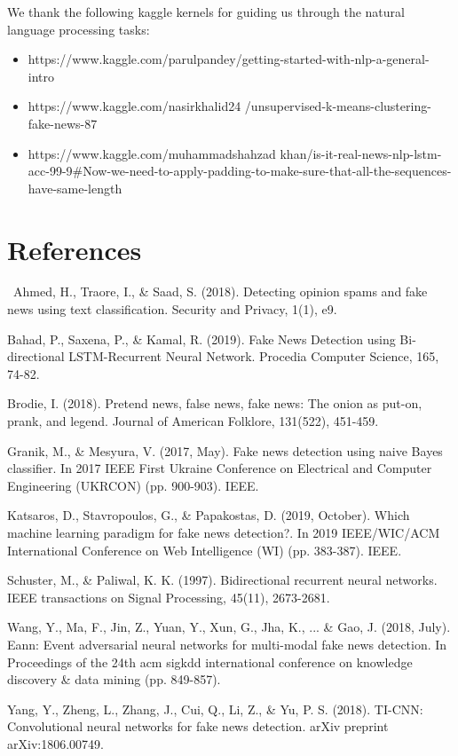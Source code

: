 \documentclass{article}
\begin{document}
\begin{multicols}{2}
We thank the following kaggle kernels for guiding us through the natural language processing tasks:
\begin{itemize}
    \item https://www.kaggle.com/parulpandey/getting-started-with-nlp-a-general-intro
    \item https://www.kaggle.com/nasirkhalid24 /unsupervised-k-means-clustering-fake-news-87
    \item https://www.kaggle.com/muhammadshahzad
    khan/is-it-real-news-nlp-lstm-acc-99-9#Now-we-need-to-apply-padding-to-make-sure-that-all-the-sequences-have-same-length
\end{itemize}


\section{References}

\quad \, Ahmed, H., Traore, I., \& Saad, S. (2018). Detecting opinion spams and fake news using text classification. Security and Privacy, 1(1), e9.

Bahad, P., Saxena, P., \& Kamal, R. (2019). Fake News Detection using Bi-directional LSTM-Recurrent Neural Network. Procedia Computer Science, 165, 74-82.

Brodie, I. (2018). Pretend news, false news, fake news: The onion as put-on, prank, and legend. Journal of American Folklore, 131(522), 451-459.

Granik, M., \& Mesyura, V. (2017, May). Fake news detection using naive Bayes classifier. In 2017 IEEE First Ukraine Conference on Electrical and Computer Engineering (UKRCON) (pp. 900-903). IEEE.

Katsaros, D., Stavropoulos, G., \& Papakostas, D. (2019, October). Which machine learning paradigm for fake news detection?. In 2019 IEEE/WIC/ACM International Conference on Web Intelligence (WI) (pp. 383-387). IEEE.

Schuster, M., \& Paliwal, K. K. (1997). Bidirectional recurrent neural networks. IEEE transactions on Signal Processing, 45(11), 2673-2681.

Wang, Y., Ma, F., Jin, Z., Yuan, Y., Xun, G., Jha, K., ... \& Gao, J. (2018, July). Eann: Event adversarial neural networks for multi-modal fake news detection. In Proceedings of the 24th acm sigkdd international conference on knowledge discovery & data mining (pp. 849-857).

Yang, Y., Zheng, L., Zhang, J., Cui, Q., Li, Z., \& Yu, P. S. (2018). TI-CNN: Convolutional neural networks for fake news detection. arXiv preprint arXiv:1806.00749.

\end{multicols}
\end{document}
